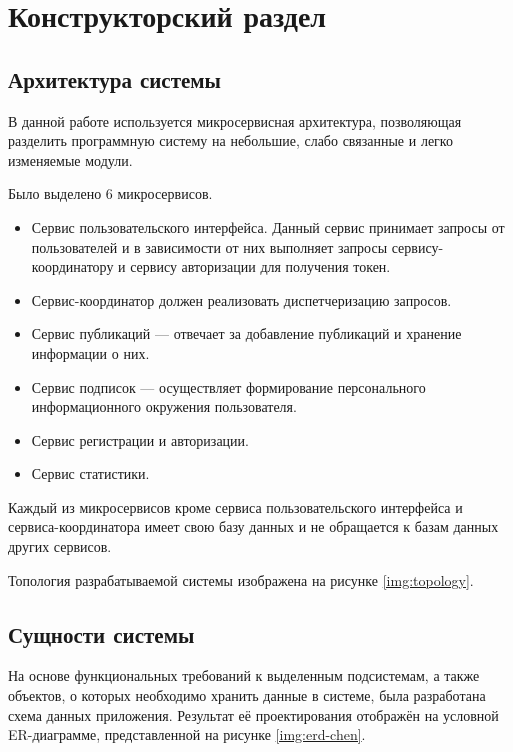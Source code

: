 \chapter{Конструкторский раздел}

\section{Архитектура системы}

В данной работе используется микросервисная архитектура, позволяющая разделить программную систему на небольшие, слабо связанные и легко изменяемые модули.

Было выделено 6 микросервисов.
\begin{itemize}
	\item Сервис пользовательского интерфейса. Данный сервис принимает запросы от пользователей и в зависимости от них выполняет запросы сервису-координатору и сервису авторизации для получения токен.
	\item Сервис-координатор должен реализовать диспетчеризацию запросов.
	\item Сервис публикаций — отвечает за добавление публикаций и хранение информации о них.
	\item Сервис подписок — осуществляет формирование персонального информационного окружения пользователя.
	\item Сервис регистрации и авторизации.
	\item Сервис статистики.
\end{itemize}

Каждый из микросервисов кроме сервиса пользовательского интерфейса и сервиса-координатора имеет свою базу данных и не обращается к базам данных других сервисов.

Топология разрабатываемой системы изображена на рисунке \ref{img:topology}.


\section{Сущности системы}

На основе функциональных требований к выделенным подсистемам, а также объектов, о которых необходимо хранить данные в системе, была разработана схема данных приложения.
Результат её проектирования отображён на условной ER-диаграмме, представленной на рисунке \ref{img:erd-chen}.


